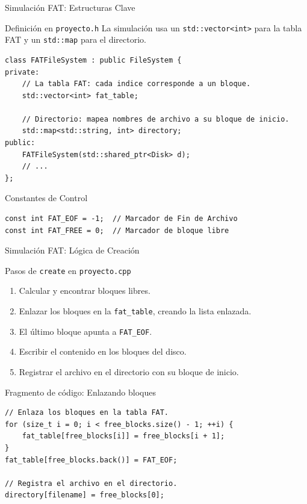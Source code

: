 \documentclass{beamer}
\begin{document}
\begin{frame}[fragile]{Simulación FAT: Estructuras Clave}
    \begin{block}{Definición en \texttt{proyecto.h}}
        La simulación usa un \texttt{std::vector<int>} para la tabla FAT y un \texttt{std::map} para el directorio.
        \begin{lstlisting}
class FATFileSystem : public FileSystem {
private:
    // La tabla FAT: cada indice corresponde a un bloque.
    std::vector<int> fat_table;
    
    // Directorio: mapea nombres de archivo a su bloque de inicio.
    std::map<std::string, int> directory;
public:
    FATFileSystem(std::shared_ptr<Disk> d);
    // ...
};
        \end{lstlisting}
    \end{block}
    \begin{block}{Constantes de Control}
        \begin{lstlisting}
const int FAT_EOF = -1;  // Marcador de Fin de Archivo
const int FAT_FREE = 0;  // Marcador de bloque libre
        \end{lstlisting}
    \end{block}
\end{frame}

\begin{frame}[fragile]{Simulación FAT: Lógica de Creación}
    \begin{block}{Pasos de \texttt{create} en \texttt{proyecto.cpp}}
        \begin{enumerate}
            \item Calcular y encontrar bloques libres.
            \item Enlazar los bloques en la \texttt{fat\_table}, creando la lista enlazada.
            \item El último bloque apunta a \texttt{FAT\_EOF}.
            \item Escribir el contenido en los bloques del disco.
            \item Registrar el archivo en el directorio con su bloque de inicio.
        \end{enumerate}
    \end{block}
    
    \begin{exampleblock}{Fragmento de código: Enlazando bloques}
        \begin{lstlisting}
// Enlaza los bloques en la tabla FAT.
for (size_t i = 0; i < free_blocks.size() - 1; ++i) {
    fat_table[free_blocks[i]] = free_blocks[i + 1];
}
fat_table[free_blocks.back()] = FAT_EOF;

// Registra el archivo en el directorio.
directory[filename] = free_blocks[0];
        \end{lstlisting}
    \end{exampleblock}
\end{frame}
\end{document}
